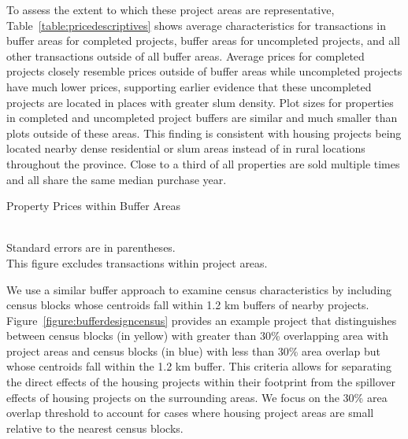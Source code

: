 \documentclass[12pt]{article}
\begin{document}
To assess the extent to which these project areas are representative, Table~\ref{table:pricedescriptives} shows average characteristics for transactions in buffer areas for completed projects, buffer areas for uncompleted projects, and all other transactions outside of all buffer areas.  Average prices for completed projects closely resemble prices outside of buffer areas while uncompleted projects have much lower prices, supporting earlier evidence that these uncompleted projects are located in places with greater slum density.  Plot sizes for properties in completed and uncompleted project buffers are similar and much smaller than plots outside of these areas.  This finding is consistent with housing projects being located nearby dense residential or slum areas instead of in rural locations throughout the province.  Close to a third of all properties are sold multiple times and all share the same median purchase year.

\begin{table}
\caption{Property Prices within Buffer Areas}\label{table:pricedescriptives}
\centering
 \\
Standard errors are in parentheses.  \\ This figure excludes transactions within project areas.
\end{table}

We use a similar buffer approach to examine census characteristics by including census blocks whose centroids fall within 1.2 km buffers of nearby projects.  Figure~\ref{figure:bufferdesigncensus} provides an example project that distinguishes between census blocks (in yellow) with greater than 30\% overlapping area with project areas and census blocks (in blue) with less than 30\% area overlap but whose centroids fall within the 1.2 km buffer.  This criteria allows for separating the direct effects of the housing projects within their footprint from the spillover effects of housing projects on the surrounding areas.  We focus on the 30\% area overlap threshold to account for cases where housing project areas are small relative to the nearest census blocks.
\end{document}
